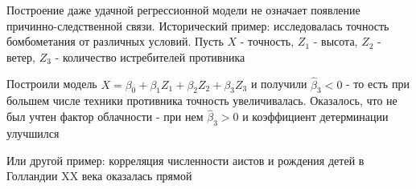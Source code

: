 Построение даже удачной регрессионной модели не означает появление причинно-следственной связи. Исторический пример: исследовалась точность бомбометания от различных условий. Пусть $X$ - точность, $Z_1$ - высота, $Z_2$ - ветер, $Z_3$ - количество истребителей противника

Построили модель $X = \beta_0 + \beta_1 Z_1 + \beta_2 Z_2 + \beta_3 Z_3$ и получили $\hat \beta_3 < 0$ - то есть при большем числе техники противника точность увеличивалась. Оказалось, что не был учтен фактор облачности - при нем $\hat \beta_3 > 0$ и коэффициент детерминации улучшился

Или другой пример: корреляция численности аистов и рождения детей в Голландии XX века оказалась прямой






